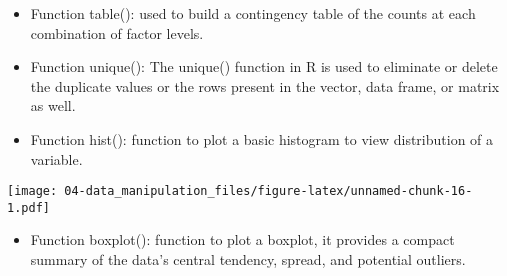 \documentclass[
]{book}
\newenvironment{Shaded}{\begin{snugshade}}{\end{snugshade}}
\newcommand{\AttributeTok}[1]{\textcolor[rgb]{0.13,0.29,0.53}{#1}}
\newcommand{\CommentTok}[1]{\textcolor[rgb]{0.56,0.35,0.01}{\textit{#1}}}
\newcommand{\FunctionTok}[1]{\textcolor[rgb]{0.13,0.29,0.53}{\textbf{#1}}}
\newcommand{\NormalTok}[1]{#1}
\newcommand{\SpecialCharTok}[1]{\textcolor[rgb]{0.81,0.36,0.00}{\textbf{#1}}}
\newcommand{\StringTok}[1]{\textcolor[rgb]{0.31,0.60,0.02}{#1}}
\providecommand{\tightlist}{%
  \setlength{\itemsep}{0pt}\setlength{\parskip}{0pt}}
\begin{document}
\begin{itemize}
\tightlist
\item
  Function table(): used to build a contingency table of the counts at each combination of factor levels.
\end{itemize}

\begin{Shaded}
\end{Shaded}

\begin{itemize}
\tightlist
\item
  Function unique(): The unique() function in R is used to eliminate or delete the duplicate values or the rows present in the vector, data frame, or matrix as well.
\end{itemize}

\begin{Shaded}
\end{Shaded}

\begin{itemize}
\tightlist
\item
  Function hist(): function to plot a basic histogram to view distribution of a variable.
\end{itemize}

\begin{Shaded}
\end{Shaded}

\texttt{[image: 04-data\_manipulation\_files/figure-latex/unnamed-chunk-16-1.pdf]}

\begin{itemize}
\tightlist
\item
  Function boxplot(): function to plot a boxplot, it provides a compact summary of the data's central tendency, spread, and potential outliers.
\end{itemize}
\end{document}
